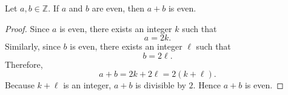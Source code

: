 \begin{theorem}
Let $a,b \in \mathbb{Z}$. If $a$ and $b$ are even, then $a+b$ is even.
\end{theorem}

\begin{proof}
Since $a$ is even, there exists an integer $k$ such that
\[
a = 2k.
\]
Similarly, since $b$ is even, there exists an integer $\ell$ such that
\[
b = 2\ell.
\]
Therefore,
\[
a+b = 2k + 2\ell = 2(k+\ell).
\]
Because $k+\ell$ is an integer, $a+b$ is divisible by $2$.
Hence $a+b$ is even.
\end{proof}